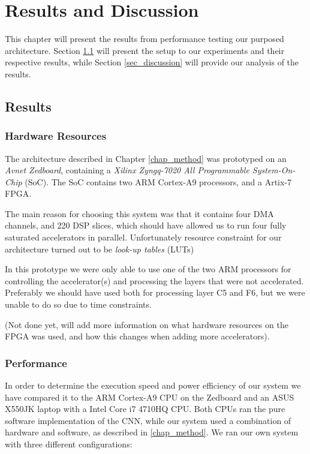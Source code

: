 \chapter{Results and Discussion} \label{chap_results}

This chapter will present the results from performance testing our purposed architecture. Section \ref{sec_results} will present the setup to our experiments and their respective results, while Section \ref{sec_discussion} will provide our analysis of the results. 

\section{Results} \label{sec_results}

\subsection{Hardware Resources}

The architecture described in Chapter \ref{chap_method} was prototyped on an \textit{Avnet Zedboard}, containing a \textit{Xilinx Zyngq-7020 All Programmable System-On-Chip} (SoC). The SoC contains two ARM Cortex-A9 processors, and a Artix-7 FPGA. 

The main reason for choosing this system was that it contains four DMA channels, and 220 DSP slices, which should have allowed us to run four fully saturated accelerators in parallel. Unfortunately resource constraint for our architecture turned out to be \textit{look-up tables} (LUTs)

In this prototype we were only able to use one of the two ARM processors for controlling the accelerator(s) and processing the layers that were not accelerated. Preferably we should have used both for processing layer C5 and F6, but we were unable to do so due to time constraints. 

(Not done yet, will add more information on what hardware resources on the FPGA was used, and how this changes when adding more accelerators). 


\subsection{Performance}

In order to determine the execution speed and power efficiency of our system we have compared it to the ARM Cortex-A9 CPU on the Zedboard and an ASUS X550JK laptop with a Intel Core i7 4710HQ CPU. Both CPUs ran the pure software implementation of the CNN, while our system used a combination of hardware and software, as described in \ref{chap_method}. We ran our own system with three different configurations:

